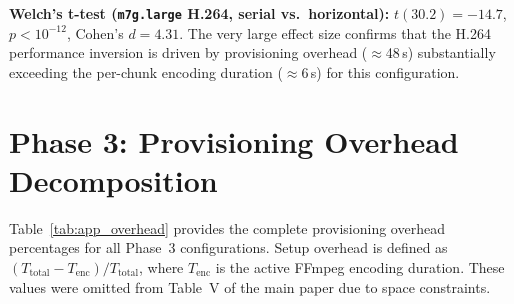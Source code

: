 \documentclass[conference]{IEEEtran}
\begin{document}
\textbf{Welch's t-test (\texttt{m7g.large} H.264, serial vs.\ horizontal):}
$t(30.2) = -14.7$, $p < 10^{-12}$, Cohen's $d = 4.31$. The very large effect
size confirms that the H.264 performance inversion is driven by provisioning
overhead ($\approx$48\,s) substantially exceeding the per-chunk encoding
duration ($\approx$6\,s) for this configuration.

\section{Phase 3: Provisioning Overhead Decomposition}
\label{app:overhead}

Table~\ref{tab:app_overhead} provides the complete provisioning overhead
percentages for all Phase~3 configurations. Setup overhead is defined as
$(T_{\text{total}} - T_{\text{enc}}) / T_{\text{total}}$, where $T_{\text{enc}}$
is the active FFmpeg encoding duration. These values were omitted from
Table~V of the main paper due to space constraints.
\end{document}
